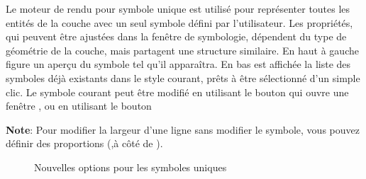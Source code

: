 Le moteur de rendu pour symbole unique est utilisé pour représenter toutes les entités de la couche avec un seul symbole défini par l'utilisateur. Les propriétés, qui peuvent être ajustées dans la fenêtre de symbologie, dépendent du type de géométrie de la couche, mais partagent une structure similaire. En haut à gauche figure un aperçu du symbole tel qu'il apparaîtra. En bas est affichée la liste des symboles déjà existants dans le style courant, prêts à être sélectionné d'un simple clic. Le symbole courant peut être modifié en utilisant le bouton  qui ouvre une fenêtre , ou en utilisant le bouton 

\textbf{Note}: Pour modifier la largeur d'une ligne sans modifier le symbole, vous pouvez définir des proportions (,à côté de 
).

\begin{figure}[ht]
\centering
   \hspace{1cm}
   \hspace{1cm}
\caption{Nouvelles options pour les symboles uniques \nixcaption}
\end{figure}

